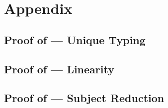\chapter{Appendix}

\section{Proof of  --- Unique Typing}
\label{unique_typing_proof}


\section{Proof of  --- Linearity}
\label{linearity_proof}


\section{Proof of  --- Subject Reduction}
\label{subject_reduction_proof}


